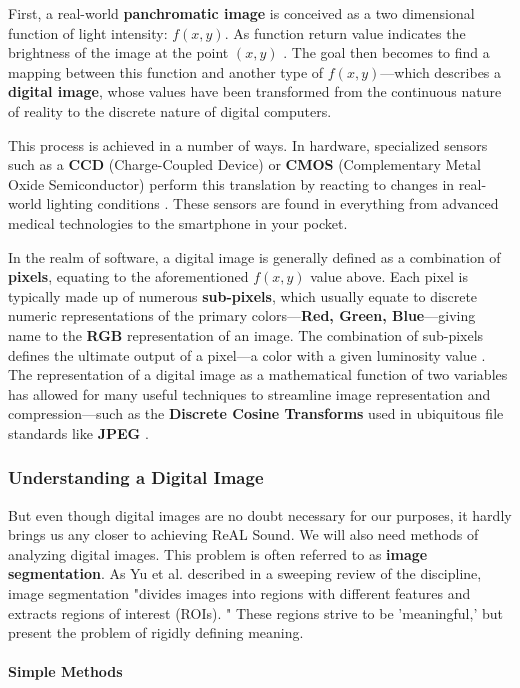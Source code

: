 \documentclass{report}
\newcommand{\rs}{ReAL Sound\xspace}
\newcommand{\tech}[1]{\textbf{#1}}
\begin{document}
First, a real-world \tech{panchromatic image} is conceived as a two dimensional function of light intensity: $f(x,y)$. As function return value indicates the brightness of the image at the point $(x,y)$ \cite{petrou2010image}. The goal then becomes to find a mapping between this function and another type of $f(x,y)$---which describes a \tech{digital image}, whose values have been transformed from the continuous nature of reality to the discrete nature of digital computers.

This process is achieved in a number of ways. In hardware, specialized sensors  such as a \tech{CCD} (Charge-Coupled Device) or \tech{CMOS} (Complementary Metal Oxide Semiconductor) perform this translation by reacting to changes in real-world lighting conditions \cite{bigas2006review}. These sensors are found in everything from advanced medical technologies to the smartphone in your pocket.  

In the realm of software, a digital image is generally defined as a combination of \tech{pixels}, equating to the aforementioned $f(x,y)$ value above. Each pixel is typically made up of numerous \tech{sub-pixels}, which usually equate to discrete numeric representations of the primary colors---\tech{Red, Green, Blue}---giving name to the \tech{RGB} representation of an image. The combination of sub-pixels defines the ultimate output of a pixel---a color with a given luminosity value \cite{subpixel}. The representation of a digital image as a mathematical function of two variables has allowed for many useful techniques to streamline image representation and compression---such as the \tech{Discrete Cosine Transforms} used in ubiquitous file standards like \tech{JPEG} \cite{saha2000image}. 

\subsubsection{Understanding a Digital Image}
But even though digital images are no doubt necessary for our purposes, it hardly brings us any closer to achieving \rs. We will also need methods of analyzing digital images. This problem is often referred to as \tech{image segmentation}. As Yu et al. described in a sweeping review of the discipline, image segmentation "divides images into regions with different features and extracts regions of interest (ROIs). \cite{yu2023techniques}" These regions strive to be 'meaningful,' but present the problem of rigidly defining meaning.

\paragraph{Simple Methods}
\end{document}
